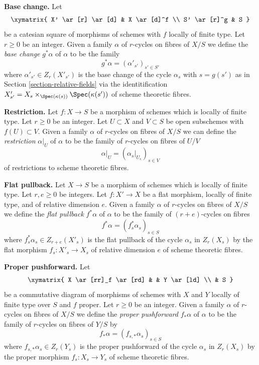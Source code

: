 \medskip\noindent
{\bf Base change.} Let
$$
\xymatrix{
X' \ar[r] \ar[d] & X \ar[d]^f \\
S' \ar[r]^g & S
}
$$
be a catesian square of morphisms of schemes with $f$ locally of finite type.
Let $r \geq 0$ be an integer. Given a family $\alpha$ of $r$-cycles on
fibres of $X/S$ we define the {\it base change} $g^*\alpha$ of $\alpha$
to be the family
$$
g^*\alpha = (\alpha'_{s'})_{s' \in S'}
$$
where $\alpha'_{s'} \in Z_r(X'_{s'})$ is the base change
of the cycle $\alpha_s$ with $s = g(s')$ as in
Section \ref{section-relative-fields} via the identitification
$X'_{s'} = X_s \times_{\Spec(\kappa(s))} \Spec(\kappa(s'))$
of scheme theoretic fibres.

\medskip\noindent
{\bf Restriction.} Let $f : X \to S$ be a morphism of schemes which is locally
of finite type. Let $r \geq 0$ be an integer. Let $U \subset X$ and
$V \subset S$ be open subschemes with $f(U) \subset V$. Given a family
$\alpha$ of $r$-cycles on fibres of $X/S$ we can define the
{\it restriction} $\alpha|_U$ of $\alpha$ to be the
family of $r$-cycles on fibres of $U/V$
$$
\alpha|_U = (\alpha_s|_{U_s})_{s \in V}
$$
of restrictions to scheme theoretic fibres.

\medskip\noindent
{\bf Flat pullback.} Let $X \to S$ be a morphism of schemes which is locally
of finite type. Let $r, e \geq 0$ be integers. Let $f : X' \to X$ be a
flat morphism, locally of finite type, and of relative dimension $e$.
Given a family $\alpha$ of $r$-cycles
on fibres of $X/S$ we define the {\it flat pullback} $f^*\alpha$ of $\alpha$
to be the family of $(r + e)$-cycles on fibres
$$
f^*\alpha = (f_s^*\alpha_s)_{s \in S}
$$
where $f_s^*\alpha_s \in Z_{r + e}(X'_s)$ is the flat pullback
of the cycle $\alpha_s$ in $Z_r(X_s)$ by the flat morphism
$f_s : X'_s \to X_s$ of relative dimension $e$
of scheme theoretic fibres.

\medskip\noindent
{\bf Proper pushforward.} Let
$$
\xymatrix{
X \ar[rr]_f \ar[rd] & & Y \ar[ld] \\
& S
}
$$
be a commutative diagram of morphisms of schemes with $X$ and $Y$
locally of finite type over $S$ and $f$ proper. Let $r \geq 0$ be an integer.
Given a family $\alpha$ of $r$-cycles on fibres of $X/S$ we define the
{\it proper pushforward} $f_*\alpha$ of $\alpha$ to be the family of
$r$-cycles on fibres of $Y/S$ by
$$
f_*\alpha = (f_{s, *}\alpha_s)_{s \in S}
$$
where $f_{s, *}\alpha_s \in Z_r(Y_s)$ is the proper pushforward
of the cycle $\alpha_s$ in $Z_r(X_s)$ by the proper morphism
$f_s : X_s \to Y_s$ of scheme theoretic fibres.


